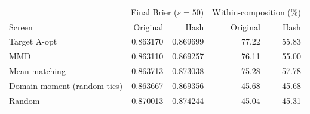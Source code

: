\begin{tabular}{lrrrr}
\toprule
 & \multicolumn{2}{c}{Final Brier ($s=50$)} & \multicolumn{2}{c}{Within-composition (\%)}\\
Screen & Original & Hash & Original & Hash\\
\midrule
Target A-opt & 0.863170 & 0.869699 & 77.22 & 55.83 \\
MMD & 0.863110 & 0.869257 & 76.11 & 55.00 \\
Mean matching & 0.863713 & 0.873038 & 75.28 & 57.78 \\
Domain moment (random ties) & 0.863667 & 0.869356 & 45.68 & 45.68 \\
Random & 0.870013 & 0.874244 & 45.04 & 45.31 \\
\bottomrule
\end{tabular}
